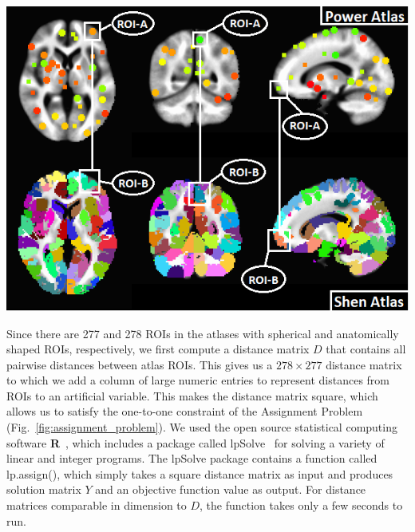 \documentclass[10pt,letterpaper]{article}\usepackage[]{graphicx}\usepackage[]{color}
\begin{document}
{\centering
	\begin{minipage}[c]{0.55\textwidth}
		\includegraphics[width=1\textwidth,clip,trim=0cm 0cm 0cm 0.0cm]{power_shen_montage_mapped.png}
	\end{minipage}\hfill
	\begin{minipage}[c]{0.43\textwidth}
		\captionsetup{type=figure}\label{fig:power_shen_mapped}
\end{minipage}}

\vspace{0.25cm}

Since there are 277 and 278 ROIs in the atlases with spherical and anatomically shaped ROIs, respectively, we first compute a distance matrix $D$ that contains all pairwise distances between atlas ROIs. This gives us a $278 \times 277$ distance matrix to which we add a column of large numeric entries to represent distances from ROIs to an artificial variable. This makes the distance matrix square, which allows us to satisfy the one-to-one constraint of the Assignment Problem (Fig.~\ref{fig:assignment_problem}). We used the open source statistical computing software \textbf{\textsf{R}}~\cite{R}, which includes a package called \textsf{lpSolve}~\cite{lpsolve} for solving a variety of linear and integer programs. The \textsf{lpSolve} package contains a function called \textsf{lp.assign()}, which simply takes a square distance matrix as input and produces solution matrix $Y$ and an objective function value as output. For distance matrices comparable in dimension to $D$, the function takes only a few seconds to run.
\end{document}
